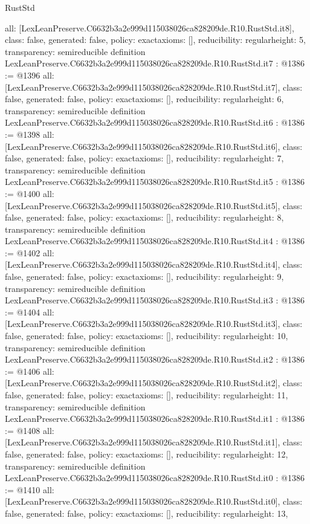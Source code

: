 \begin{lexlean}{RustStd}
\begin{coremodule}
{  all: [LexLeanPreserve.C6632b3a2e999d115038026ca828209de.R10.RustStd.it8],
  class: false,
  generated: false,
  policy: exact{axioms: []},
  reducibility: regular{height: 5},
  transparency: semireducible
}
definition LexLeanPreserve.C6632b3a2e999d115038026ca828209de.R10.RustStd.it7 : @1386 := @1396 {
  all: [LexLeanPreserve.C6632b3a2e999d115038026ca828209de.R10.RustStd.it7],
  class: false,
  generated: false,
  policy: exact{axioms: []},
  reducibility: regular{height: 6},
  transparency: semireducible
}
definition LexLeanPreserve.C6632b3a2e999d115038026ca828209de.R10.RustStd.it6 : @1386 := @1398 {
  all: [LexLeanPreserve.C6632b3a2e999d115038026ca828209de.R10.RustStd.it6],
  class: false,
  generated: false,
  policy: exact{axioms: []},
  reducibility: regular{height: 7},
  transparency: semireducible
}
definition LexLeanPreserve.C6632b3a2e999d115038026ca828209de.R10.RustStd.it5 : @1386 := @1400 {
  all: [LexLeanPreserve.C6632b3a2e999d115038026ca828209de.R10.RustStd.it5],
  class: false,
  generated: false,
  policy: exact{axioms: []},
  reducibility: regular{height: 8},
  transparency: semireducible
}
definition LexLeanPreserve.C6632b3a2e999d115038026ca828209de.R10.RustStd.it4 : @1386 := @1402 {
  all: [LexLeanPreserve.C6632b3a2e999d115038026ca828209de.R10.RustStd.it4],
  class: false,
  generated: false,
  policy: exact{axioms: []},
  reducibility: regular{height: 9},
  transparency: semireducible
}
definition LexLeanPreserve.C6632b3a2e999d115038026ca828209de.R10.RustStd.it3 : @1386 := @1404 {
  all: [LexLeanPreserve.C6632b3a2e999d115038026ca828209de.R10.RustStd.it3],
  class: false,
  generated: false,
  policy: exact{axioms: []},
  reducibility: regular{height: 10},
  transparency: semireducible
}
definition LexLeanPreserve.C6632b3a2e999d115038026ca828209de.R10.RustStd.it2 : @1386 := @1406 {
  all: [LexLeanPreserve.C6632b3a2e999d115038026ca828209de.R10.RustStd.it2],
  class: false,
  generated: false,
  policy: exact{axioms: []},
  reducibility: regular{height: 11},
  transparency: semireducible
}
definition LexLeanPreserve.C6632b3a2e999d115038026ca828209de.R10.RustStd.it1 : @1386 := @1408 {
  all: [LexLeanPreserve.C6632b3a2e999d115038026ca828209de.R10.RustStd.it1],
  class: false,
  generated: false,
  policy: exact{axioms: []},
  reducibility: regular{height: 12},
  transparency: semireducible
}
definition LexLeanPreserve.C6632b3a2e999d115038026ca828209de.R10.RustStd.it0 : @1386 := @1410 {
  all: [LexLeanPreserve.C6632b3a2e999d115038026ca828209de.R10.RustStd.it0],
  class: false,
  generated: false,
  policy: exact{axioms: []},
  reducibility: regular{height: 13},
}
\end{coremodule}
\end{lexlean}
